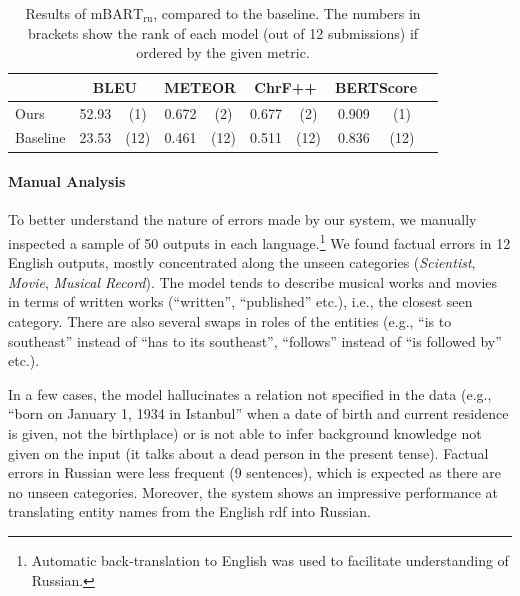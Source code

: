\begin{table}[t]
    \footnotesize\centering
    \begin{tabular}{llcccccccc}\toprule
                 & \multicolumn{2}{c}{\bf BLEU} & \multicolumn{2}{c}{\bf METEOR} & \multicolumn{2}{c}{\bf ChrF++} & \multicolumn{2}{c}{\bf BERTScore}                               \\\midrule
        Ours     & 52.93                        & (1)                            & 0.672                          & (2)                               & 0.677 & (2)  & 0.909 & (1)  \\
        Baseline & 23.53                        & (12)                           & 0.461                          & (12)                              & 0.511 & (12) & 0.836 & (12) \\\bottomrule
    \end{tabular}
    \caption{Results of $\text{mBART}_{\text{ru}}$, compared to the baseline. The numbers in brackets show the rank of each model (out of 12 submissions) if ordered by the given metric.}
    \label{tab:mbart:results-ru}
\end{table}

\paragraph{Manual Analysis}
To better understand the nature of errors made by our system, we manually inspected a sample of 50 outputs in each language.\footnote{Automatic back-translation to English was used to facilitate understanding of Russian.} We found factual errors in 12 English outputs, mostly concentrated along the unseen categories (\emph{Scientist}, \emph{Movie}, \emph{Musical Record}). The model tends to describe musical works and movies in terms of written works (``written'', ``published'' etc.), i.e., the closest seen category. There are also several swaps in roles of the entities (e.g., ``is to southeast'' instead of ``has to its southeast'', ``follows'' instead of ``is followed by'' etc.).

In a few cases, the model hallucinates a relation not specified in the data (e.g., ``born on January 1, 1934 in Istanbul'' when a date of birth and current residence is given, not the birthplace) or is not able to infer background knowledge not given on the input (it talks about a dead person in the present tense).
Factual errors in Russian were less frequent (9 sentences), which is expected as there are no unseen categories. Moreover, the system shows an impressive performance at translating entity names from the English \ac{rdf} into Russian.

